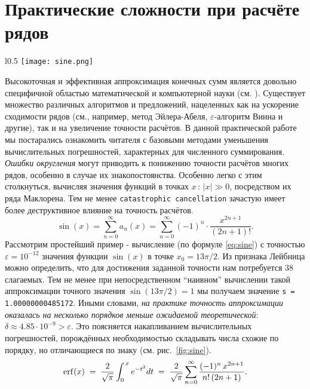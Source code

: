 \documentclass{article}
\theoremstyle{definition}
\begin{document}
\section{Практические сложности при расчёте рядов}
\begin{wrapfigure}{l}{0.5\textwidth} \vspace{-0.5cm}
\centering
\texttt{[image: sine.png]}
\caption{Коэффициенты $a_n(x_0)$ ряда Маклорена \eqref{eq:sine}}
\label{fig:sine}
\end{wrapfigure}
Высокоточная и эффективная аппроксимация конечных сумм является довольно специфичной областью математической и компьютерной науки (см. \cite{online}). Существует множество различных алгоритмов и предложений, нацеленных как на ускорение сходимости рядов (см., например, метод Эйлера-Абеля, $\varepsilon$-алгоритм Винна и другие), так и на увеличение точности расчётов. В данной практической работе мы постарались ознакомить читателя с базовыми методами уменьшения вычислительных погрешностей, характерных для численного суммирования.
\textit{Ошибки округления} могут приводить к понижению точности расчётов многих рядов, особенно в случае их знакопостоянства. Особенно легко с этим столкнуться, вычисляя значения функций в точках $x\,:\,|x|\gg 0$, посредством их ряда Маклорена.
Тем не менее \verb_catastrophic cancellation_ зачастую имеет более деструктивное влияние на точность расчётов. 
\begin{equation} \label{eq:sine}
\sin(x) = \sum_{n=0}^\infty a_n(x) = \sum_{n=0}^\infty (-1)^n\cdot\dfrac{x^{2n+1}}{(2n+1)!}.
\end{equation}
\newpage\noindent
Рассмотрим простейший пример - вычисление (по формуле \ref{eq:sine}) с точностью $\varepsilon=10^{-12}$ значения функции $\sin(x)$ в точке $x_0=13\pi/2$. Из признака Лейбница можно определить, что для достижения заданной точности нам потребуется 38 слагаемых. Тем не менее при непосредственном ``наивном'' вычислении такой аппроксимации точного значения $\sin(13\pi/2) = 1$ мы получаем значение \verb_s = 1.00000000485172_. Иными словами, \textit{на практике точность аппроксимации оказалась на несколько порядков меньше ожидаемой теоретической}: $\delta \approx 4.85\cdot 10^{-9} > \varepsilon$. Это поясняется накапливанием вычислительных погрешностей, порождённых необходимостью складывать числа схожие по порядку, но отличающиеся по знаку (см. рис.~\ref{fig:sine}).
\begin{equation*}
\erf(x) \;=\; \dfrac{2}{\sqrt{\pi}}\int_0^{\,x} e^{-t^2}dt \;=\; \dfrac{2}{\sqrt{\pi}}\sum_{n=0}^\infty \dfrac{(-1)^n\,x^{2n+1}}{n!\,(2n+1)}.
\end{equation*}\par
\end{document}
